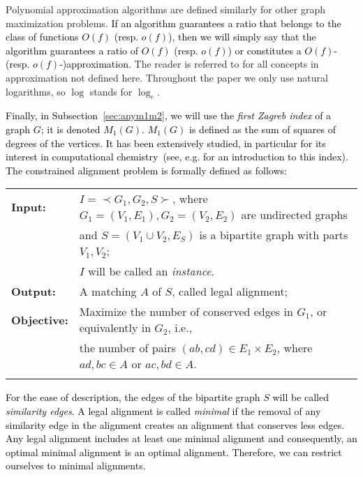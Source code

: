 \documentclass[final]{dmtcs-episciences}
\newcommand\mar[1]{\textcolor{black}{#1}}
\newcommand\ces[1]{\textcolor{black}{#1}}
\begin{document}
 Polynomial approximation algorithms are defined similarly for other graph maximization problems. \mar{If an algorithm guarantees a ratio that belongs to the class of functions $O(f)$ (resp. $o(f)$), then we will simply say that the algorithm guarantees a ratio of $O(f)$ (resp. $o(f)$) or constitutes a $O(f)$- (resp. $o(f)$-)approximation.} The reader is referred to \cite{ausiellobook} for all concepts in approximation not defined here. Throughout the paper we only use natural logarithms, so $\log$ stands for $\log_e$.   

\mar{Finally, in Subsection~\ref{sec:anym1m2}, we will use the {\em first Zagreb index} of a graph $G$; it is denoted $M_1(G)$. $M_1(G)$ is defined as the sum of  squares of  degrees of the vertices. It has been extensively studied, in particular for its interest in computational chemistry~(see, e.g. \citet{Zagreb-30years} for an introduction to this index).}\\

\noindent
\mar{The constrained alignment problem is formally defined as follows:}

\mar{
\begin{tabular}{ll}
\textbf{ Input:}& $I=\prec G_1, G_2, S\succ$, where $G_1=(V_1,E_1), G_2=(V_2,E_2)$ are undirected graphs \\
& and  $S=(V_1\cup V_2, E_S)$  is a bipartite graph with parts $V_1,V_2$;\\
& $I$ will be called an {\em instance}.\\
\textbf{ Output:}& A matching $A$ of $S$, called legal alignment;\\
\textbf{ Objective:}& Maximize the number of conserved edges in $G_1$, or equivalently in $G_2$, i.e., \\
& the number of pairs $(ab,cd)\in E_1\times E_2$, where $ad,bc\in A$ or $ac,bd\in A$.\\
&
\end{tabular}}

\ces{For the ease of description, the edges of the bipartite graph $S$ will be called  \emph{ similarity edges}.}
\mar{A legal alignment is called {\em minimal} if the removal of any similarity edge in the alignment creates an alignment that conserves less edges. Any legal alignment includes at least one minimal alignment and consequently,  an optimal minimal alignment is an optimal alignment. Therefore, we can restrict ourselves to minimal alignments.}
\end{document}
